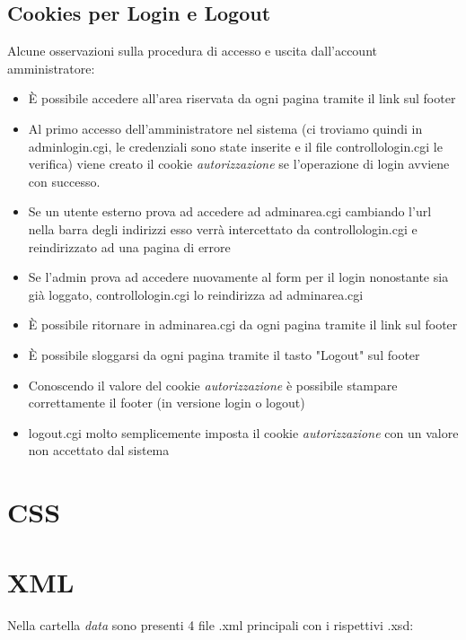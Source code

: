 \documentclass[12pt]{article}
\begin{document}
\subsection{Cookies per Login e Logout}
Alcune osservazioni sulla procedura di accesso e uscita dall'account amministratore:
\begin{itemize}
\item \`E possibile accedere all'area riservata da ogni pagina tramite il link sul footer
\item Al primo accesso dell'amministratore nel sistema (ci troviamo quindi in adminlogin.cgi, le credenziali sono state inserite e il file controllologin.cgi le verifica) viene creato il cookie \textit{autorizzazione} se l'operazione di login avviene con successo.
\item Se un utente esterno prova ad accedere ad adminarea.cgi cambiando l'url nella barra degli indirizzi esso verr\`a intercettato da controllologin.cgi e reindirizzato ad una pagina di errore
\item Se l'admin prova ad accedere nuovamente al form per il login nonostante sia gi\`a loggato, controllologin.cgi lo reindirizza ad adminarea.cgi
\item \`E possibile ritornare in adminarea.cgi da ogni pagina tramite il link sul footer
\item \`E possibile sloggarsi da ogni pagina tramite il tasto "Logout" sul footer
\item Conoscendo il valore del cookie \textit{autorizzazione} \`e possibile stampare correttamente il footer (in versione login o logout)
\item logout.cgi molto semplicemente imposta il cookie \textit{autorizzazione} con un valore non accettato dal sistema
\end{itemize}
	
		\newpage	
	\section{CSS}
			
					\newpage
				
		\section{XML}
	Nella cartella \textit{data} sono presenti 4 file .xml principali con i rispettivi .xsd:
\end{document}
